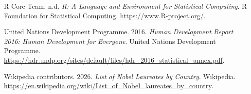\documentclass[
  letterpaper,
  DIV=11,
  numbers=noendperiod]{scrartcl}
\newlength{\cslhangindent}
\newenvironment{CSLReferences}[2] %
 {\begin{list}{}{%
  \setlength{\itemindent}{0pt}
  \setlength{\leftmargin}{0pt}
  \setlength{\parsep}{0pt}
  \ifodd #1
   \setlength{\leftmargin}{\cslhangindent}
   \setlength{\itemindent}{-1\cslhangindent}
  \fi
  \setlength{\itemsep}{#2\baselineskip}}}
 {\end{list}}
\begin{document}
\protect{}\label{refs}
\begin{CSLReferences}{1}{1}
R Core Team. n.d. \emph{R: A Language and Environment for Statistical
Computing}. R Foundation for Statistical Computing.
\url{https://www.R-project.org/}.

United Nations Development Programme. 2016. \emph{Human Development
Report 2016: Human Development for Everyone}. United Nations Development
Programme.
\url{https://hdr.undp.org/sites/default/files/hdr_2016_statistical_annex.pdf}.

Wikipedia contributors. 2026. \emph{List of Nobel Laureates by Country}.
Wikipedia.
\url{https://en.wikipedia.org/wiki/List_of_Nobel_laureates_by_country}.

\end{CSLReferences}
\end{document}

